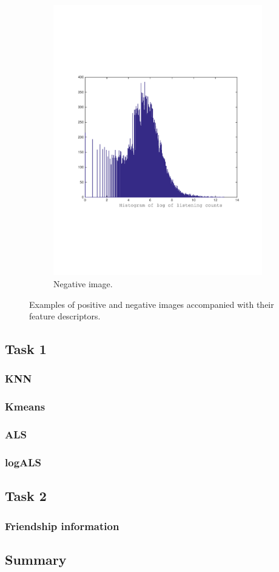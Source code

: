 \begin{figure}[h]
\begin{subfigure}[b]{0.45\textwidth}
    \includegraphics[width=\textwidth]{figures/histLogYtrain_crop.pdf}
    \caption{Negative image.}
  \end{subfigure}
  \caption{Examples of positive and negative images accompanied with their feature descriptors.}
  \label{fig:starting_images}
\end{figure}
 
\subsection{Task 1}
\subsubsection{KNN}
\subsubsection{Kmeans}
\subsubsection{ALS}
\subsubsection{logALS}

\subsection{Task 2}
\subsubsection{Friendship information}


\subsection{Summary}



